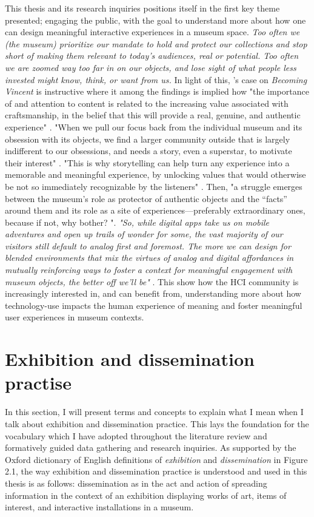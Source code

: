 This thesis and its research inquiries positions itself in the first key theme presented; engaging the public, with the goal to understand more about how one can design meaningful interactive experiences in a museum space. \emph{Too often we (the museum) prioritize our mandate to hold and protect our collections and stop short of making them relevant to today’s audiences, real or potential. Too often we are zoomed way too far in on our objects, and lose sight of what people less invested might know, think, or want from us.}\autocite[p. 1]{vermeeren_museum_2018} In light of this, \autocite{vermeeren_vincent_2018}'s case on \emph{Becoming Vincent} is instructive where it among the findings is implied how "the importance of and attention to content is related to the increasing value associated with craftsmanship, in the belief that this will provide a real, genuine, and authentic experience" \autocite[p. 298]{vermeeren_vincent_2018}. "When we pull our focus back from the individual museum and its obsession with its objects, we find a larger community outside that is largely indifferent to our obsessions, and needs a story, even a superstar, to motivate their interest" \autocite[p. 1]{vermeeren_museum_2018}. "This is why storytelling can help turn any experience into a memorable and meaningful experience, by unlocking values that would otherwise be not so immediately recognizable by the listeners" \autocite[p. 299]{vermeeren_vincent_2018}. Then, "a struggle emerges between the museum’s role as protector of authentic objects and the “facts” around them and its role as a site of experiences—preferably extraordinary ones, because if not, why bother? "\autocite[p. 1]{vermeeren_museum_2018}. \emph{"So, while digital apps take us on mobile adventures and open up trails of wonder for some, the vast majority of our visitors still default to analog first and foremost. The more we can design for blended environments that mix the virtues of analog and digital affordances in mutually reinforcing ways to foster a context for meaningful engagement with museum objects, the better off we’ll be"} \autocite[p. 1]{vermeeren_museum_2018}. This show how the HCI community is increasingly interested in, and can benefit from, understanding more about how technology-use impacts the human experience of meaning and foster meaningful user experiences in museum contexts.

\section{Exhibition and dissemination practise}
In this section, I will present terms and concepts to explain what I mean when I talk about exhibition and dissemination practice. This lays the foundation for the vocabulary which I have adopted throughout the literature review and formatively guided data gathering and research inquiries. As supported by the Oxford dictionary of English definitions of \emph{exhibition} and \emph{dissemination} in Figure 2.1, the way exhibition and dissemination practice is understood and used in this thesis is as follows: dissemination as in the act and action of spreading information in the context of an exhibition displaying works of art, items of interest, and interactive installations in a museum.

